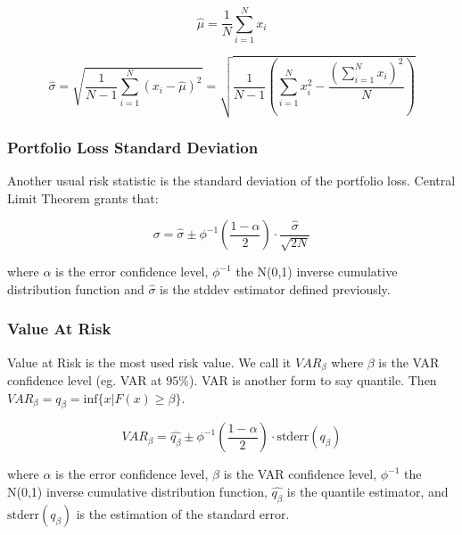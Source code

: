 \documentclass[a4paper,12pt,final]{article}
\begin{document}
\begin{displaymath}
\widehat{\mu} = \frac{1}{N} \sum_{i=1}^{N} x_i
\end{displaymath}

\begin{displaymath}
\widehat{\sigma} =
\sqrt{\frac{1}{N-1} \sum_{i=1}^{N} \left( x_i - \widehat{\mu} \right)^2} =
\sqrt{\frac{1}{N-1} \left( \sum_{i=1}^{N} x_i^2 - \frac{\left(\sum_{i=1}^{N} x_i \right)^2}{N} \right)}
\end{displaymath}

\subsubsection{Portfolio Loss Standard Deviation}
Another usual risk statistic is the standard deviation of the portfolio loss.
Central Limit Theorem \cite{stats:schaum} grants that:

\begin{displaymath}
\sigma = \widehat{\sigma} \pm \phi^{-1}\left(\frac{1-\alpha}{2}\right) \cdot \frac{\widehat{\sigma}}{\sqrt{2N}}
\end{displaymath}

where $\alpha$ is the error confidence level, $\phi^{-1}$ the N(0,1) inverse 
cumulative distribution function and $\widehat{\sigma}$ is the stddev estimator
defined previously.

\subsubsection{Value At Risk}
Value at Risk \cite{var:jorion} is the most used risk value. We call it 
$VAR_{\beta}$ where $\beta$ is the VAR confidence level (eg. VAR at $95\%$).
VAR is another form to say quantile. Then
$VAR_{\beta} = q_{\beta} = \textrm{inf}\{x | F(x) \geq \beta \}$. 

\begin{displaymath}
VAR_{\beta} = \widehat{q_{\beta}} \pm \phi^{-1}\left(\frac{1-\alpha}{2}\right) \cdot \textrm{stderr}(q_{\beta})
\end{displaymath}

where $\alpha$ is the error confidence level, $\beta$ is the VAR confidence 
level, $\phi^{-1}$ the N(0,1) inverse cumulative distribution function, 
$\widehat{q_{\beta}}$ is the quantile estimator, and $\textrm{stderr}(q_{\beta})$
is the estimation of the standard error.
\end{document}
